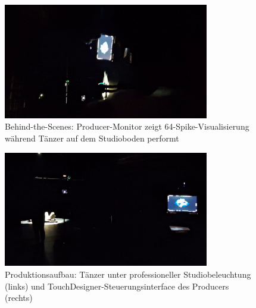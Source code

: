 \begin{figure}[htbp]
    \centering
    \includegraphics[width=0.8\textwidth,height=0.4\textheight,keepaspectratio]{images/BehindTheScenesDuringShotTopDownProducerScreenVisibleAsWellAsDancerOnFloor.png}
    \caption{Behind-the-Scenes: Producer-Monitor zeigt 64-Spike-Visualisierung während Tänzer auf dem Studioboden performt}
    \label{fig:bts_topdown_produktion}
\end{figure}

\begin{figure}[htbp]
    \centering
    \includegraphics[width=0.8\textwidth,height=0.4\textheight,keepaspectratio]{images/BehindTheScenesTopDownWithDancerOnTheLeftInsideTheHeavyLightAndProducerViewOnRightSide.png}
    \caption{Produktionsaufbau: Tänzer unter professioneller Studiobeleuchtung (links) und TouchDesigner-Steuerungsinterface des Producers (rechts)}
    \label{fig:bts_topdown_splitview}
\end{figure}


